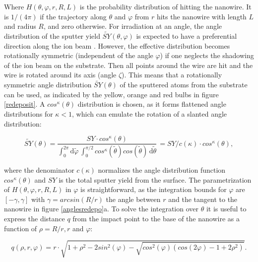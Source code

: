 Where $H(\theta,\varphi,r,R,L)$ is the probability distribution of hitting the nanowire. It is $1/(4\pi)$ if the trajectory along $\theta$ and $\varphi$ from $r$ hits the nanowire with length $L$ and radius $R$, and zero otherwise. For irradiation at an angle, the angle distribution of the sputter yield $\tilde{SY}(\theta,\varphi)$ is expected to have a preferential direction along the ion beam \cite{verdeil_angular_2008}. However, the effective distribution becomes rotationally symmetric (independent of the angle $\varphi$) if one neglects the shadowing of the ion beam on the substrate. Then all points around the wire are hit and the wire is rotated around its axis (angle $\zeta$). This means that a rotationally symmetric angle distribution $\tilde{SY}(\theta)$ of the sputtered atoms from the substrate can be used, as indicated by the yellow, orange and red bulbs in figure \ref{redeposit}. A $cos^\kappa(\theta)$ distribution is chosen, as it forms flattened angle distributions for $\kappa < 1$, which can emulate the rotation of a slanted angle distribution: 

\begin{equation}
\tilde{SY}(\theta) = \frac{SY \cdot cos^\kappa(\theta)}{\int_0^{2\pi} \! \mathrm{d}\tilde\varphi \,\int_0^{\pi/2} \! cos^\kappa(\tilde\theta) cos(\tilde\theta)\,  \mathrm{d}\tilde\theta} \, = SY /c(\kappa) \cdot cos^\kappa(\theta) ,
\end{equation}

where the denominator $c(\kappa)$ normalizes the angle distribution function $cos^\kappa(\theta)$ and $SY$ is the total sputter yield from the surface. The parametrization of $H(\theta,\varphi,r,R,L)$ in $\varphi$ is straightforward, as the integration bounds for $\varphi$ are $[-\gamma, \gamma]$ with $\gamma = arcsin(R/r)$ the angle between $r$ and the tangent to the nanowire in figure \ref{anglesredepo}a. To solve the integration over $\theta$ it is useful to express the distance $q$ from the impact point to the base of the nanowire as a function of $\rho = R/r, r$ and $\varphi$:

\begin{equation}
q(\rho,r,\varphi) = r\cdot \sqrt{1 + \rho^2 - 2sin^2(\varphi) - \sqrt{cos^2(\varphi)(cos(2\varphi) - 1 + 2\rho^2)}}.
\end{equation}


